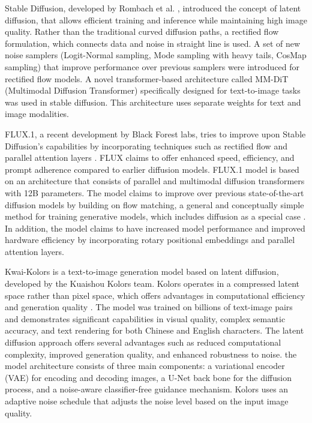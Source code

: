 \documentclass{article}
\begin{document}
Stable Diffusion, developed by Rombach et al. \cite{kulal2024stablediffusion}, introduced the concept of latent diffusion, that allows efficient training 
and inference while maintaining high image quality. Rather than the traditional curved diffusion paths, a rectified flow formulation, which connects data and noise in straight line is used. A set of new noise samplers (Logit-Normal sampling, Mode sampling 
with heavy tails, CosMap sampling) that improve performance over previous samplers were introduced for rectified flow models. 
A novel transformer-based architecture called MM-DiT (Multimodal Diffusion Transformer) specifically designed for text-to-image 
tasks was used in stable diffusion. This architecture uses separate weights for text and image modalities.

FLUX.1, a recent development by Black Forest labs, tries to improve upon Stable Diffusion's capabilities by incorporating techniques such as rectified flow and parallel attention layers \cite{flux2024medium}. FLUX claims to offer enhanced speed, efficiency, 
and prompt adherence compared to earlier diffusion models. FLUX.1 model is based on an architecture that consists of
parallel and multimodal diffusion transformers with 12B parameters. The model claims to improve over previous state-of-the-art diffusion 
models by building on flow matching, a general and conceptually simple method for training generative models, which includes 
diffusion as a special case \cite{flux2024main}. In addition, the model claims to have increased model performance and improved hardware efficiency by 
incorporating rotary positional embeddings and parallel attention layers.

Kwai-Kolors is a text-to-image generation model based on latent diffusion, developed by the Kuaishou Kolors team. 
Kolors operates in a compressed latent space rather than pixel space, 
which offers advantages in computational efficiency and generation quality \cite{kolors2024}. The model was trained on billions of text-image 
pairs and demonstrates significant capabilities in visual quality, complex semantic accuracy, and text rendering for both 
Chinese and English characters. The latent diffusion approach offers several advantages such as reduced computational complexity, improved 
generation quality, and enhanced robustness to noise. the model architecture consists of three main components: a variational encoder 
(VAE) for encoding and decoding images, a U-Net back bone for the diffusion process, and a noise-aware classifier-free guidance 
mechanism. Kolors uses an 
adaptive noise schedule that adjusts the noise level based on the input image quality.
\end{document}
